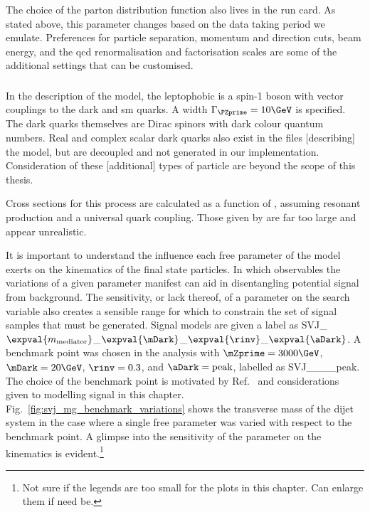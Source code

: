 The choice of the parton distribution function also lives in the run card. As stated above, this parameter changes based on the data taking period we emulate. Preferences for particle separation, momentum and direction cuts, beam energy, and the \acrshort{qcd} renormalisation and factorisation scales are some of the additional settings that can be customised.




\subsubsection{\texorpdfstring{\schannel}{s-channel}}
\label{subsubsec:svj_signal_madgraph_schannel}

In the description of the \schannel model, the leptophobic \PZprime is a spin-1 boson with vector couplings to the dark and \acrshort{sm} quarks. A width $\Gamma_{\PZprime} = \text{10}\GeV$ is specified. The dark quarks themselves are Dirac spinors with dark colour quantum numbers. Real and complex scalar dark quarks also exist in the files [describing] the model, but are decoupled and not generated in our implementation. Consideration of these [additional] types of particle are beyond the scope of this thesis.

Cross sections for this process are calculated as a function of \mZprime, assuming resonant production and a universal quark coupling. Those given by \MADGRAPH are far too large and appear unrealistic. %

It is important to understand the influence each free parameter of the model exerts on the kinematics of the final state particles. In which observables the variations of a given parameter manifest can aid in disentangling potential signal from background. The sensitivity, or lack thereof, of a parameter on the search variable also creates a sensible range for which to constrain the set of signal samples that must be generated. Signal models are given a label as SVJ\_\-$\expval{m_{\mathrm{mediator}}}$\_\-$\expval{\mDark}$\_\-$\expval{\rinv}$\_\-$\expval{\aDark}$. A benchmark point was chosen in the analysis with $\mZprime = \text{3000}\GeV$, $\mDark = \text{20}\GeV$, $\rinv = \text{0.3}$, and $\aDark = \text{peak}$, labelled as SVJ\_\_\_\_\-peak. The choice of the benchmark point is motivated by Ref.~ and considerations given to modelling signal in this chapter. Fig.~\ref{fig:svj_mg_benchmark_variations} shows the transverse mass of the dijet system \mT in the case where a single free parameter was varied with respect to the benchmark point. A glimpse into the sensitivity of the parameter on the kinematics is evident.\footnote{Not sure if the legends are too small for the plots in this chapter. Can enlarge them if need be.}

